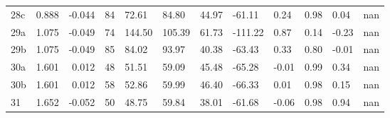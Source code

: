 \begin{tabular}{lrrrllllllll}
  28c &  0.888 & -0.044 &   84 &       72.61 &       84.80 &        44.97 &        -61.11 &           0.24 &         0.98 &    0.04 &         nan \\
  29a &  1.075 & -0.049 &   74 &      144.50 &      105.39 &        61.73 &       -111.22 &           0.87 &         0.14 &   -0.23 &         nan \\
  29b &  1.075 & -0.049 &   85 &       84.02 &       93.97 &        40.38 &        -63.43 &           0.33 &         0.80 &   -0.01 &         nan \\
  30a &  1.601 &  0.012 &   48 &       51.51 &       59.09 &        45.48 &        -65.28 &          -0.01 &         0.99 &    0.34 &         nan \\
  30b &  1.601 &  0.012 &   58 &       52.86 &       59.99 &        46.40 &        -66.33 &           0.01 &         0.98 &    0.15 &         nan \\
   31 &  1.652 & -0.052 &   50 &       48.75 &       59.84 &        38.01 &        -61.68 &          -0.06 &         0.98 &    0.94 &         nan \\
\bottomrule
\end{tabular}
